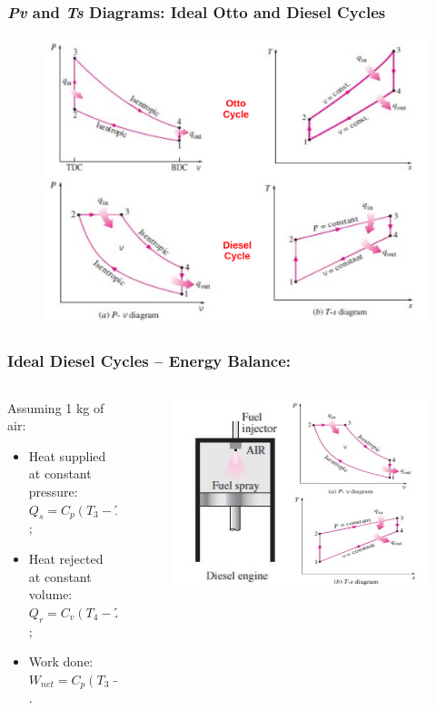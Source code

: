 \documentclass[10pt,compress]{beamer}
\begin{document}
\begin{frame}
 \frametitle{{\it Pv} and {\it Ts} Diagrams: Ideal Otto and Diesel Cycles}
    \begin{figure}%
     \begin{center}
      \includegraphics[width=10.cm,clip]{./Pics/InternalCombustion_IdealOttoxDieselCycles}
     \end{center}
    \end{figure}   
\end{frame}


\begin{frame}
 \frametitle{Ideal Diesel Cycles -- Energy Balance:}
  \begin{columns}
   \begin{column}[c]{0.5\linewidth}
   Assuming 1 kg of air:
    \begin{itemize}
     \item <1-> Heat supplied at constant pressure: $Q_{s}=C_{p}\left(T_{3}-T_{2}\right)$;
     \item <2-> Heat rejected at constant volume: $Q_{r}=C_{v}\left(T_{4}-T_{1}\right)$;
     \item <3-> Work done: $W_{net}=C_{p}\left(T_{3}-T_{2}\right)-C_{v}\left(T_{4}-T_{1}\right)$.
    \end{itemize}
   \end{column}
   \begin{column}[c]{0.5\linewidth}
    \begin{figure}%
     \begin{center}
      \includegraphics[width=6.cm,clip]{./Pics/InternalCombustion_IdealDieselCycle}
     \end{center}
    \end{figure}   
   \end{column}  
  \end{columns}
\end{frame}
\end{document}
